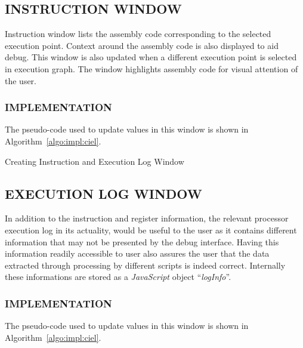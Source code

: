 \subsection {INSTRUCTION WINDOW}

Instruction window lists the assembly code corresponding to the selected execution point. Context around the assembly code is also displayed to aid debug. This window is also updated when a different execution point is selected in execution graph. The window highlights assembly code for visual attention of the user.

\subsubsection{IMPLEMENTATION}

The pseudo-code used to update values in this window is shown in Algorithm~\ref{algo:impl:ciel}.

\IncMargin{1em}
\begin{algorithm}[h]
\DontPrintSemicolon
{} 
\caption{Creating Instruction and Execution Log Window}
\label{algo:impl:ciel}
\end{algorithm}\DecMargin{1em}

\subsection {EXECUTION LOG WINDOW}

In addition to the instruction and register information, the relevant processor execution log in its actuality, would be useful to the user as it contains different information that may not be presented by the debug interface. Having this information readily accessible to user also assures the user that the data extracted through processing by different scripts is indeed correct. Internally these informations are stored as a {\it JavaScript} object ``{\it logInfo}''.

\subsubsection{IMPLEMENTATION}

The pseudo-code used to update values in this window is shown in Algorithm~\ref{algo:impl:ciel}.

